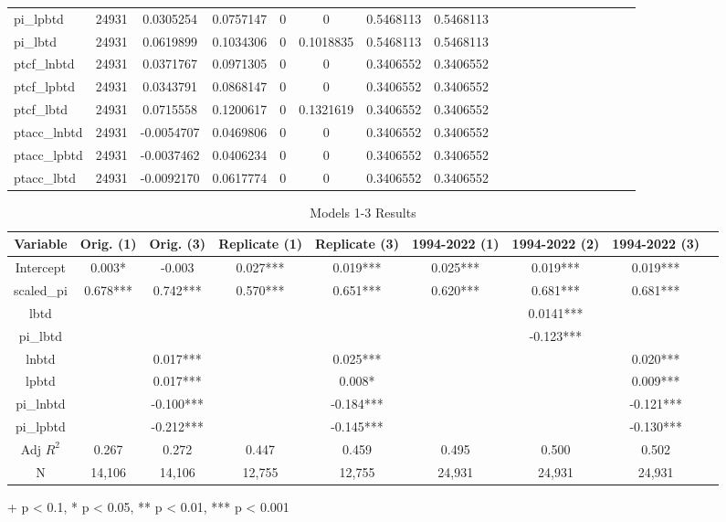 \documentclass[12pt]{article}
\begin{document}
\begin{table}[htbp]
\begin{adjustbox}{max width=\textwidth}
\begin{tabular}{|l|c|c|c|c|c|c|c|c|c|c|c|c|c|c|c|c|c|c|}
pi\_lpbtd & 24931 & 0.0305254 & 0.0757147 & 0 & 0 & 0.5468113 & 0.5468113 \\
pi\_lbtd & 24931 & 0.0619899 & 0.1034306 & 0 & 0.1018835 & 0.5468113 & 0.5468113 \\
ptcf\_lnbtd & 24931 & 0.0371767 & 0.0971305 & 0 & 0 & 0.3406552 & 0.3406552 \\
ptcf\_lpbtd & 24931 & 0.0343791 & 0.0868147 & 0 & 0 & 0.3406552 & 0.3406552 \\
ptcf\_lbtd & 24931 & 0.0715558 & 0.1200617 & 0 & 0.1321619 & 0.3406552 & 0.3406552 \\
ptacc\_lnbtd & 24931 & -0.0054707 & 0.0469806 & 0 & 0 & 0.3406552 & 0.3406552 \\
ptacc\_lpbtd & 24931 & -0.0037462 & 0.0406234 & 0 & 0 & 0.3406552 & 0.3406552 \\
ptacc\_lbtd & 24931 & -0.0092170 & 0.0617774 & 0 & 0 & 0.3406552 & 0.3406552 \\
\hline

\end{tabular}
\end{adjustbox}
\end{table}

\begin{table}[htbp]
\centering
\caption{Models 1-3 Results}
\label{tab:Models_1_3_Results}
\begin{adjustbox}{max width=\textwidth}
\begin{tabular}{|c|c|c|c|c|c|c|c|c|}
\hline
Variable & Orig. (1) & Orig. (3) & Replicate (1) & Replicate (3) & 1994-2022 (1) & 1994-2022 (2) & 1994-2022 (3) \\
\hline
Intercept & 0.003* & -0.003 & 0.027*** & 0.019*** & 0.025*** & 0.019*** & 0.019*** \\
scaled\_pi & 0.678*** & 0.742*** & 0.570*** & 0.651*** & 0.620*** & 0.681*** & 0.681*** \\
lbtd &  &  &  &  &  & 0.0141*** & \\
pi\_lbtd &  &  &  &  &  & -0.123*** & \\
lnbtd &  & 0.017*** &  & 0.025*** &  &  & 0.020*** \\
lpbtd &  & 0.017*** &  & 0.008* &  &  & 0.009*** \\
pi\_lnbtd &  & -0.100*** &  & -0.184*** &  &  & -0.121*** \\
pi\_lpbtd &  & -0.212*** &  & -0.145*** &  &  & -0.130*** \\
\hline
Adj $R^2$ & 0.267 & 0.272 & 0.447 & 0.459 & 0.495 & 0.500 & 0.502 \\
\hline
N & 14,106 & 14,106 & 12,755 & 12,755 & 24,931 & 24,931 & 24,931 \\
\hline
\end{tabular}
\end{adjustbox}
\footnotesize{+ p < 0.1, * p < 0.05, ** p < 0.01, *** p < 0.001}
\end{table}
\end{document}
